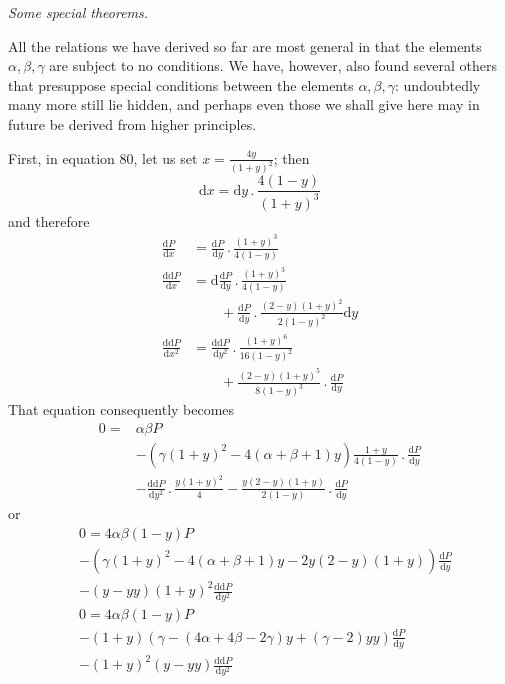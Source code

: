 \begin{center}\textit{Some special theorems.}\end{center}
All the relations we have derived so far are most general in that the elements $\alpha,\beta,\gamma$ are subject to no conditions. We have, however, also found several others that presuppose special conditions between the elements $\alpha,\beta,\gamma$: undoubtedly many more still lie hidden, and perhaps even those we shall give here may in future be derived from higher principles.
\par{}
First, in equation 80, let us set $x=\frac{4y}{(1+y)^2}$; then
\[
\mathrm dx=\mathrm dy\mathbin{.}\frac{4(1-y)}{(1+y)^3}
\]
and therefore
\[
\begin{aligned}
\frac{\mathrm dP}{\mathrm dx}&=\frac{\mathrm dP}{\mathrm dy}\mathbin{.}\frac{(1+y)^3}{4(1-y)}\\
\frac{\mathrm{dd}P}{\mathrm dx}&=\mathrm d\frac{\mathrm dP}{\mathrm dy}\mathbin{.}\frac{(1+y)^3}{4(1-y)}\\&\qquad+\frac{\mathrm dP}{\mathrm dy}\mathbin{.}\frac{(2-y)(1+y)^2}{2(1-y)^2}\mathrm dy\\
\frac{\mathrm{dd}P}{\mathrm dx^2}&=\frac{\mathrm{dd}P}{\mathrm dy^2}\mathbin{.}\frac{(1+y)^6}{16(1-y)^2}\\&\qquad+\frac{(2-y)(1+y)^5}{8(1-y)^3}\mathbin{.}\frac{\mathrm dP}{\mathrm dy}
\end{aligned}
\]
That equation consequently becomes
\[
\begin{aligned}
0={}&\alpha\beta P\\
&-(\gamma(1+y)^2-4(\alpha+\beta+1)y)\frac{1+y}{4(1-y)}\mathbin{.}\frac{\mathrm dP}{\mathrm dy}\\
&-\frac{\mathrm{dd}P}{\mathrm dy^2}\mathbin{.}\frac{y(1+y)^2}4
-\frac{y(2-y)(1+y)}{2(1-y)}\mathbin{.}\frac{\mathrm dP}{\mathrm dy}
\end{aligned}
\]
or
\[
\begin{aligned}
&0=4\alpha\beta(1-y)P\\
&-(\gamma(1+y)^2-4(\alpha+\beta+1)y-2y(2-y)(1+y))\frac{\mathrm dP}{\mathrm dy}\\
&-(y-yy)(1+y)^2\frac{\mathrm{dd}P}{\mathrm dy^2}\\
&0=4\alpha\beta(1-y)P\\
&-(1+y)(\gamma-(4\alpha+4\beta-2\gamma)y+(\gamma-2)yy)\frac{\mathrm dP}{\mathrm dy}\\
&-(1+y)^2(y-yy)\frac{\mathrm{dd}P}{\mathrm dy^2}
\end{aligned}
\]
